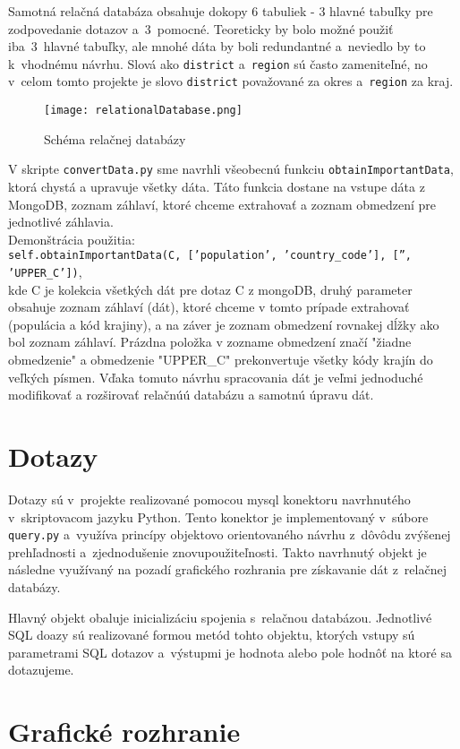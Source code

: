 \documentclass [11pt, a4paper]{article}
\begin{document}
Samotná relačná databáza obsahuje dokopy 6 tabuliek - 3 hlavné tabuľky pre zodpovedanie dotazov a~3~pomocné. Teoreticky by bolo možné použiť iba~3~hlavné tabuľky, ale mnohé dáta by boli redundantné a~neviedlo by to k~vhodnému návrhu. Slová ako \texttt{district} a~\texttt{region} sú často zameniteľné, no v~celom tomto projekte je slovo \texttt{district} považované za okres a~\texttt{region} za kraj.

\begin{figure}[H]
\begin{center}
\texttt{[image: relationalDatabase.png]}
\caption{Schéma relačnej databázy}
\end{center}
\end{figure}

V skripte \texttt{convertData.py} sme navrhli všeobecnú funkciu \texttt{obtainImportantData}, ktorá chystá a upravuje všetky dáta. Táto funkcia dostane na vstupe dáta z MongoDB, zoznam záhlaví, ktoré chceme extrahovať a zoznam obmedzení pre jednotlivé záhlavia.\\

Demonštrácia použitia:\\
\texttt{self.obtainImportantData(C, ['population', 'country\_code'], ['', 'UPPER\_C'])}, \\kde C je kolekcia všetkých dát pre dotaz C z mongoDB, druhý parameter obsahuje zoznam záhlaví (dát), ktoré chceme v tomto prípade extrahovať (populácia a kód krajiny), a na záver je zoznam obmedzení rovnakej dĺžky ako bol zoznam záhlaví. Prázdna položka v zozname obmedzení značí "žiadne obmedzenie" a obmedzenie "UPPER\_C" prekonvertuje všetky kódy krajín do veľkých písmen. Vďaka tomuto návrhu spracovania dát je veľmi jednoduché modifikovať a rozširovať relačnúú databázu a samotnú úpravu dát.

\section*{Dotazy}
Dotazy sú v~projekte realizované pomocou mysql konektoru navrhnutého v~skriptovacom jazyku Python. Tento konektor je implementovaný v~súbore \texttt{query.py} a~využíva princípy objektovo orientovaného návrhu z~dôvôdu zvýšenej prehľadnosti a~zjednodušenie znovupoužiteľnosti. Takto navrhnutý objekt je následne využívaný na pozadí grafického rozhrania pre získavanie dát z~relačnej databázy.

Hlavný objekt obaluje inicializáciu spojenia s~relačnou databázou. Jednotlivé SQL doazy sú realizované formou metód tohto objektu, ktorých vstupy sú parametrami SQL dotazov a~výstupmi je hodnota alebo pole hodnôť na ktoré sa dotazujeme.

\section*{Grafické rozhranie}
\end{document}
